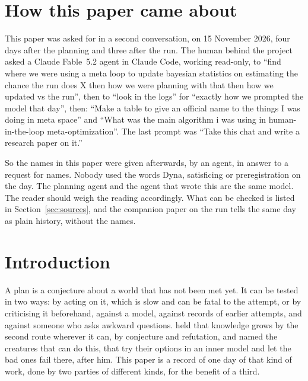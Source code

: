 \documentclass[11pt,a4paper]{article}
\begin{document}
\section*{How this paper came about}

This paper was asked for in a second conversation, on 15 November 2026, four days after the planning and three after the run. The human behind the project asked a Claude Fable~5.2 agent in Claude Code, working read-only, to ``find where we were using a meta loop to update bayesian statistics on estimating the chance the run does X then how we were planning with that then how we updated vs the run'', then to ``look in the logs'' for ``exactly how we prompted the model that day'', then: ``Make a table to give an official name to the things I was doing in meta space'' and ``What was the main algorithm i was using in human-in-the-loop meta-optimization''. The last prompt was ``Take this chat and write a research paper on it.''

So the names in this paper were given afterwards, by an agent, in answer to a request for names. Nobody used the words Dyna, satisficing or preregistration on the day. The planning agent and the agent that wrote this are the same model. The reader should weigh the reading accordingly. What can be checked is listed in Section~\ref{sec:sources}, and the companion paper on the run \citep{batsuk2026fifth} tells the same day as plain history, without the names.

\section{Introduction}

A plan is a conjecture about a world that has not been met yet. It can be tested in two ways: by acting on it, which is slow and can be fatal to the attempt, or by criticising it beforehand, against a model, against records of earlier attempts, and against someone who asks awkward questions. \citet{popper1963} held that knowledge grows by the second route wherever it can, by conjecture and refutation, and \citet{dennett1995} named the creatures that can do this, that try their options in an inner model and let the bad ones fail there, after him. This paper is a record of one day of that kind of work, done by two parties of different kinds, for the benefit of a third.
\end{document}
